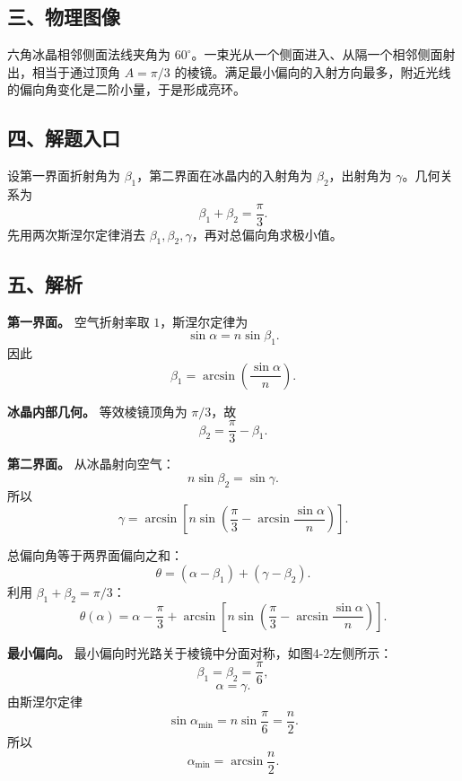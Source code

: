 \documentclass[12pt,a4paper,UTF8]{ctexart}
\begin{document}
\subsection{三、物理图像}\label{ux4e09ux7269ux7406ux56feux50cf-3}

六角冰晶相邻侧面法线夹角为
\(60^\circ\)。一束光从一个侧面进入、从隔一个相邻侧面射出，相当于通过顶角
\(A=\pi/3\)
的棱镜。满足最小偏向的入射方向最多，附近光线的偏向角变化是二阶小量，于是形成亮环。

\subsection{四、解题入口}\label{ux56dbux89e3ux9898ux5165ux53e3-3}

设第一界面折射角为 \(\beta_1\)，第二界面在冰晶内的入射角为
\(\beta_2\)，出射角为 \(\gamma\)。几何关系为 \[
\beta_1+\beta_2=\frac\pi3.
\] 先用两次斯涅尔定律消去
\(\beta_1,\beta_2,\gamma\)，再对总偏向角求极小值。

\subsection{五、解析}\label{ux4e94ux89e3ux6790-3}

\textbf{第一界面。} 空气折射率取 \(1\)，斯涅尔定律为 \[
\sin\alpha=n\sin\beta_1.
\] 因此 \[
\beta_1=\arcsin\left(\frac{\sin\alpha}{n}\right). \tag{1}
\]

\textbf{冰晶内部几何。} 等效棱镜顶角为 \(\pi/3\)，故 \[
\beta_2=\frac\pi3-\beta_1. \tag{2}
\]

\textbf{第二界面。} 从冰晶射向空气： \[
n\sin\beta_2=\sin\gamma.
\] 所以 \[
\gamma
=\arcsin\left[
n\sin\left(
\frac\pi3-\arcsin\frac{\sin\alpha}{n}
\right)
\right]. \tag{3}
\]

总偏向角等于两界面偏向之和： \[
\theta=(\alpha-\beta_1)+(\gamma-\beta_2).
\] 利用 \(\beta_1+\beta_2=\pi/3\)： \[
\boxed{
\theta(\alpha)
=\alpha-\frac\pi3
+\arcsin\left[
n\sin\left(
\frac\pi3-\arcsin\frac{\sin\alpha}{n}
\right)
\right]
}. \tag{4}
\]

\textbf{最小偏向。} 最小偏向时光路关于棱镜中分面对称，如图4-2左侧所示：
\[
\beta_1=\beta_2=\frac\pi6, \tag{5}
\] \[
\alpha=\gamma. \tag{6}
\] 由斯涅尔定律 \[
\sin\alpha_{\min}=n\sin\frac\pi6=\frac n2.
\] 所以 \[
\alpha_{\min}=\arcsin\frac n2. \tag{7}
\]
\end{document}
